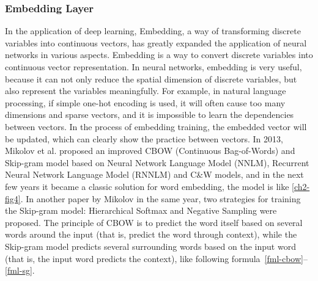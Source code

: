 \subsubsection{Embedding Layer}

In the application of deep learning, Embedding, a way of transforming discrete variables into continuous vectors, has greatly expanded the application of neural networks in various aspects. Embedding is a way to convert discrete variables into continuous vector representation. In neural networks, embedding is very useful, because it can not only reduce the spatial dimension of discrete variables, but also represent the variables meaningfully. For example, in natural language processing, if simple one-hot encoding is used, it will often cause too many dimensions and sparse vectors, and it is impossible to learn the dependencies between vectors. In the process of embedding training, the embedded vector will be updated, which can clearly show the practice between vectors. In 2013, Mikolov et al. proposed an improved CBOW (Continuous Bag-of-Words) and Skip-gram model based on Neural Network Language Model (NNLM)\cite{bengio2003neural}, Recurrent Neural Network Language Model (RNNLM) \cite{mikolov2011extensions} and C\&W models\cite{mikolov2013efficient}, and in the next few years it became a classic solution for word embedding, the model is like \figurename{\ref{ch2-fig4}}. In another paper by Mikolov in the same year, two strategies for training the Skip-gram model: Hierarchical Softmax and Negative Sampling were proposed\cite{mikolov2013distributed}. The principle of CBOW is to predict the word itself based on several words around the input (that is, predict the word through context), while the Skip-gram model predicts several surrounding words based on the input word (that is, the input word predicts the context), like following formula~\ref{fml-cbow}--\ref{fml-sg}.

